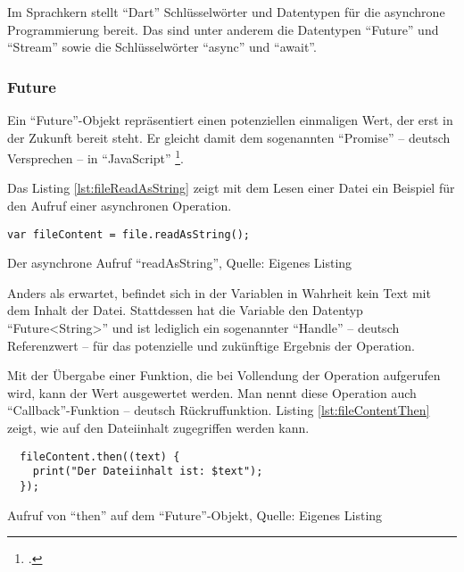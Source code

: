 Im Sprachkern stellt \enquote{Dart} Schlüsselwörter und Datentypen für die asynchrone Programmierung bereit.
Das sind unter anderem die Datentypen \enquote{Future} und \enquote{Stream} sowie die Schlüsselwörter \enquote{async} und \enquote{await}.

\subsubsection{Future}
Ein \enquote{Future}-Objekt repräsentiert einen potenziellen einmaligen Wert, der erst in der Zukunft bereit steht.
Er gleicht damit dem sogenannten \enquote{Promise} -- deutsch Versprechen -- in \enquote{JavaScript}  \footcite[Vgl.][]{PromiseJavaScriptMDN}.

Das Listing \ref{lst:fileReadAsString} zeigt mit dem Lesen einer Datei ein Beispiel für den Aufruf einer asynchronen Operation.

\ifIncludeFigures
  \begin{listing}[ht]
    \begin{verbatim}
var fileContent = file.readAsString();
\end{verbatim}
    \caption[Der asynchrone Aufruf \enquote{readAsString}]{Der asynchrone Aufruf \enquote{readAsString}, Quelle: Eigenes Listing}
    \label{lst:fileReadAsString}
  \end{listing}
\fi

Anders als erwartet, befindet sich in der Variablen  in Wahrheit kein Text mit dem Inhalt der Datei.
Stattdessen hat die Variable den Datentyp \enquote{Future<String>} und ist lediglich ein sogenannter \enquote{Handle}
-- deutsch Referenzwert --
für das potenzielle und zukünftige Ergebnis der Operation.

Mit der Übergabe einer Funktion, die bei Vollendung der Operation aufgerufen wird, kann der Wert ausgewertet werden.
Man nennt diese Operation auch \enquote{Callback}-Funktion -- deutsch Rückruffunktion.
Listing \ref{lst:fileContentThen}
zeigt, wie auf den Dateiinhalt zugegriffen werden kann.

\ifIncludeFigures
  \begin{listing}[ht]
    \begin{verbatim}
  fileContent.then((text) {
    print("Der Dateiinhalt ist: $text");
  });
\end{verbatim}
    \caption[Aufruf von \enquote{then} auf dem \enquote{Future}-Objekt]{Aufruf von \enquote{then} auf dem \enquote{Future}-Objekt, Quelle: Eigenes Listing}
    \label{lst:fileContentThen}
  \end{listing}
\fi

